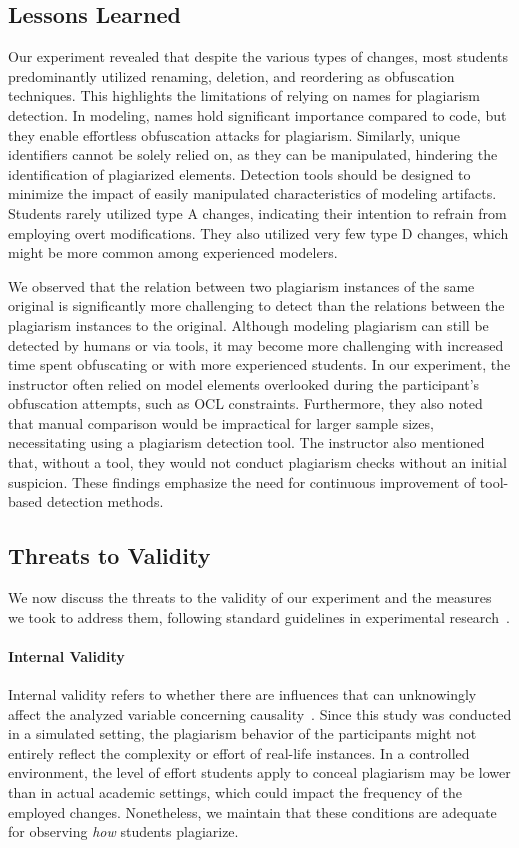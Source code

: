 \subsection{Lessons Learned}
Our experiment revealed that despite the various types of changes, most students predominantly utilized renaming, deletion, and reordering as obfuscation techniques. This highlights the limitations of relying on names for plagiarism detection. In modeling, names hold significant importance compared to code, but they enable effortless obfuscation attacks for plagiarism. Similarly, unique identifiers cannot be solely relied on, as they can be manipulated, hindering the identification of plagiarized elements.
Detection tools should be designed to minimize the impact of easily manipulated characteristics of modeling artifacts.
%
Students rarely utilized type A changes, indicating their intention to refrain from employing overt modifications. They also utilized very few type D changes, which might be more common among experienced modelers.

We observed that the relation between two plagiarism instances of the same original is significantly more challenging to detect than the relations between the plagiarism instances to the original.
Although modeling plagiarism can still be detected by humans or via tools, it may become more challenging with increased time spent obfuscating or with more experienced students.
In our experiment, the instructor often relied on model elements overlooked during the participant's obfuscation attempts, such as \ac{OCL} constraints.
Furthermore, they also noted that manual comparison would be impractical for larger sample sizes, necessitating using a plagiarism detection tool.
The instructor also mentioned that, without a tool, they would not conduct plagiarism checks without an initial suspicion.
These findings emphasize the need for continuous improvement of tool-based detection methods.

\subsection{Threats to Validity}
We now discuss the threats to the validity of our experiment and the measures we took to address them, following standard guidelines in experimental research~\cite{Wohlin2012}.
%
\paragraph{Internal Validity}
Internal validity refers to whether there are influences that can unknowingly affect the analyzed variable concerning causality~\cite{Wohlin2012}.
%
Since this study was conducted in a simulated setting, the plagiarism behavior of the participants might not entirely reflect the complexity or effort of real-life instances. In a controlled environment, the level of effort students apply to conceal plagiarism may be lower than in actual academic settings, which could impact the frequency of the employed changes.
%
Nonetheless, we maintain that these conditions are adequate for observing \textit{how} students plagiarize.
%
